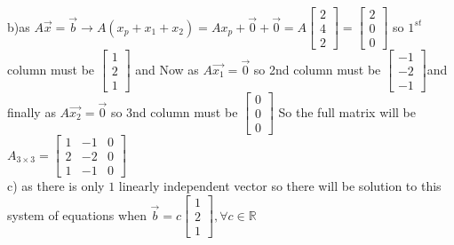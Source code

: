 \documentclass[a4paper,11pt]{article}
\numberwithin{equation}{section}
\begin{document}
\begin{itemize}
\begin{itemize}
    b)as $A\vec{x}=\vec{b} \rightarrow A(x_p+x_1+x_2)=Ax_p+\vec{0}+\vec{0}=A\begin{bmatrix} 2\\4\\2\end{bmatrix}=\begin{bmatrix} 2\\0\\0\end{bmatrix}$ so $1^{st}$ column must be $\begin{bmatrix} 1\\2\\1\end{bmatrix}$ and Now as $A\vec{x_1}=\vec{0}$ so 2nd column must be $\begin{bmatrix} -1\\-2\\-1\end{bmatrix}$and finally as $A\vec{x_2}=\vec{0}$ so 3nd column must be $\begin{bmatrix} 0\\0\\0\end{bmatrix}$ So the full matrix will be $A_{3\times 3}=\begin{bmatrix}
        1&-1&0\\2&-2&0\\1&-1&0
    \end{bmatrix}$\\

    c) as there is only $1$ linearly independent vector so there will be solution to this system of equations when $\vec{b}=c\begin{bmatrix}
        1\\2\\1
    \end{bmatrix},\forall c \in \mathbb{R}$\\
 

\end{itemize}
\end{itemize}
\end{document}
